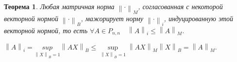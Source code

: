 \newtheorem*{th14_10_2}{Теорема}\begin{th14_10_2}Любая матричная норма $\left \|\cdot\right \|_M$, согласованная с некоторой векторной нормой $\left \|\cdot\right \|_B$, мажорирует норму $\left \|\cdot\right \|_i$, индуцированную этой векторной нормой, то есть $\forall A\in P_{n,n}\quad \left \|A\right \|_i\leqslant \left \|A\right \|_M$.
\end{th14_10_2}\begin{Proof}
	$\left \|A\right \|_i = \underset{\left \|X\right \|_B = 1}{sup} \left \|AX\right \|_B \leqslant \underset{\left \|X\right \|_B = 1}{\sup} \left \|AX\right \|_M \left \|X\right \|_B = \left \|A\right \|_M$.
\end{Proof}





